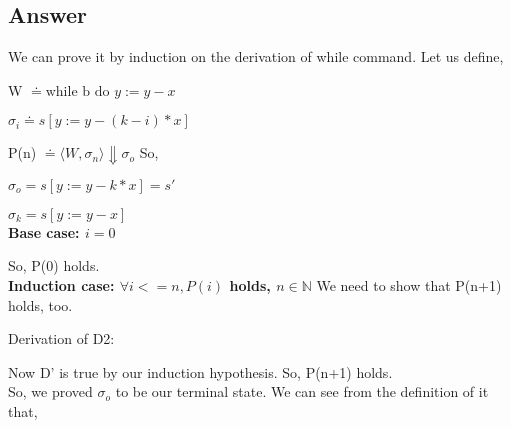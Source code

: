 \documentclass[a4paper, 11pt]{article}
\begin{document}
\subsection{Answer}

We can prove it by induction on the derivation of while command.\newline 
Let us define, 

W $\doteq \textrm{while b do } y := y-x $

$\sigma_i \doteq s[y := y -(k-i)*x]$

P(n) $\doteq \langle W, \sigma_n \rangle \Downarrow \sigma_o$ \newline
So,

$\sigma_o = s[y := y -k*x] = s'$

$\sigma_k = s[y := y -x]$ 
\\[5mm]
\textbf{Base case: $i = 0 $}
\begin{prooftree}

  
\end{prooftree} 
So, P(0) holds.
\\[5mm]
\textbf{Induction case: $\forall i <= n, P(i)$ holds, $n \in \mathbb{N}$}
We need to show that P(n+1) holds, too.

\begin{prooftree}
  
  
\end{prooftree}
Derivation of D2:
\begin{prooftree}
  
  
\end{prooftree}
Now D' is true by our induction hypothesis. So, P(n+1) holds. 
\\[5mm]
So, we proved $\sigma_o$ to be our terminal state. We can see from the definition of it that,
\end{document}
